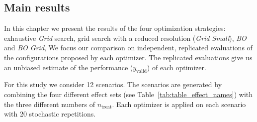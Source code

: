 \documentclass[bimj,fleqn]{w-art}
\theoremstyle{plain}
\theoremstyle{definition}
\begin{document}

\subsection{Main results}

In this chapter we present the results of the four optimization strategies: exhaustive \emph{Grid} search, grid search with a reduced resolution (\emph{Grid Small}), \emph{BO} and \emph{BO Grid},
We focus our comparison on independent, replicated evaluations of the configurations proposed by each optimizer.
The replicated evaluations give us an unbiased estimate of the performance ($y_{\text{valid}}$) of each optimizer.

For this study we consider 12 scenarios.
The scenarios are generated by combining the four different effect sets (see Table~\ref{tab:table_effect_names}) with the three different numbers of $n_{\text{treat}}$.
Each optimizer is applied on each scenario with 20 stochastic repetitions.
\end{document}
